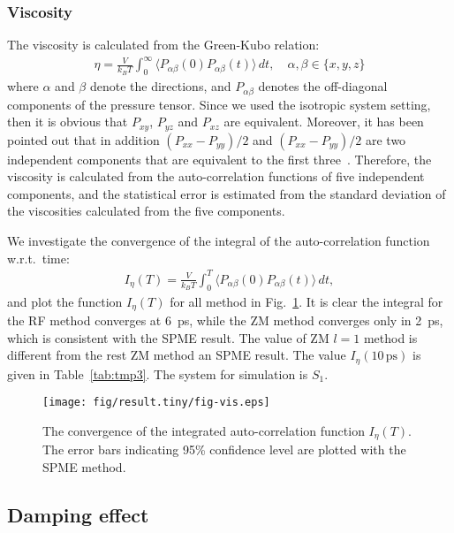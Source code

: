 \documentclass[aip,jcp,a4paper,preprint,unsortedaddress,onecolumn,fleqn]{revtex4-1}
\newcommand{\systemsb}{S_1}
\begin{document}
\subsubsection{Viscosity}
The viscosity is calculated from the Green-Kubo relation:
\begin{align}
  \eta = \frac{V}{k_BT}\int_0^\infty\langle P_{\alpha\beta}(0) P_{\alpha\beta}(t)\rangle\,dt, \quad \alpha,\beta \in \{x, y, z\}
\end{align}
where $\alpha$ and $\beta$ denote the directions, and
$P_{\alpha\beta}$ denotes the off-diagonal components of the pressure
tensor. Since we used the isotropic system setting, then it is obvious
that $P_{xy}$, $P_{yz}$ and $P_{xz}$ are equivalent. Moreover, it has
been pointed out that in addition $(P_{xx} - P_{yy})/2$ and $(P_{xx} -
P_{yy})/2$ are two independent components that are equivalent to the
first three~\cite{alfe1998first}. Therefore, the viscosity is
calculated from the auto-correlation functions of five independent
components, and the statistical error is estimated from the standard
deviation of the viscosities calculated from the five components.

We investigate the convergence of the integral of the auto-correlation function w.r.t.~time:
\begin{align}
  I_\eta(T) = \frac{V}{k_BT}\int_0^T\langle P_{\alpha\beta}(0) P_{\alpha\beta}(t)\rangle\,dt,
\end{align}
and plot the function $I_\eta(T) $ for all method in
Fig.~\ref{fig:tmp4}.  It is clear the integral for the RF method
converges at 6~ps, while the ZM method converges only in 2~ps, which
is consistent with the SPME result.  The value of ZM $l=1$ method is
different from the rest ZM method an SPME result.  The value
$I_\eta(10\,\textrm{ps})$ is given in Table~\ref{tab:tmp3}.  The
system for simulation is $\systemsb$.

\begin{figure}
  \centering
  \texttt{[image: fig/result.tiny/fig-vis.eps]}
  \caption{The convergence of the integrated auto-correlation function $I_\eta(T) $. The error bars indicating 95\% confidence level are plotted with the SPME method.}
  \label{fig:tmp4}
\end{figure}


\subsection{Damping effect}
\end{document}

